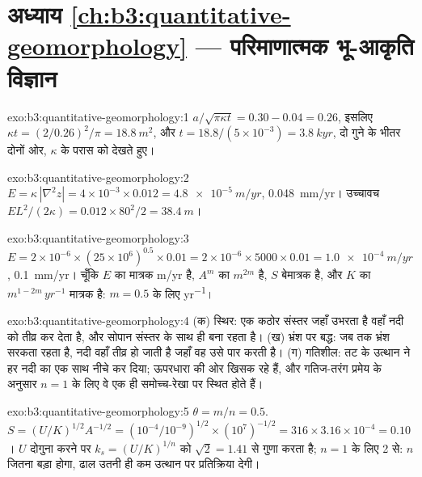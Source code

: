 \section*{अध्याय \ref{ch:b3:quantitative-geomorphology} --- परिमाणात्मक भू-आकृति विज्ञान}

\begin{solution}{exo:b3:quantitative-geomorphology:1}
$a/\sqrt{\pi\kappa t} = 0.30 - 0.04 = 0.26$, इसलिए $\kappa t = (2/0.26)^2/\pi =
\qty{18.8}{m^2}$, और $t = 18.8/(5\times10^{-3}) = \qty{3.8}{kyr}$, दो गुने के भीतर
दोनों ओर, $\kappa$ के परास को देखते हुए।
\end{solution}

\begin{solution}{exo:b3:quantitative-geomorphology:2}
$E = \kappa\,|\nabla^2 z| = 4\times10^{-3}\times0.012 =
\qty{4.8e-5}{m/yr}$, \qty{0.048}{mm/yr}। उच्चावच $E L^2/(2\kappa) =
0.012\times80^2/2 = \qty{38.4}{m}$।
\end{solution}

\begin{solution}{exo:b3:quantitative-geomorphology:3}
$E = 2\times10^{-6}\times(25\times10^6)^{0.5}\times0.01 = 2\times10^{-6}
\times5000\times0.01 = \qty{1.0e-4}{m/yr}$, \qty{0.1}{mm/yr}। चूँकि $E$ का
मात्रक \unit{m/yr} है, $A^m$ का $\unit{m}^{2m}$ है, $S$ बेमात्रक है, और $K$ का
$\unit{m}^{1-2m}\,\unit{yr^{-1}}$ मात्रक है: $m = 0.5$ के लिए \unit{yr^{-1}}।
\end{solution}

\begin{solution}{exo:b3:quantitative-geomorphology:4}
(क) स्थिर: एक कठोर संस्तर जहाँ उभरता है वहाँ नदी को तीव्र कर देता है, और सोपान
संस्तर के साथ ही बना रहता है। (ख) भ्रंश पर बद्ध: जब तक भ्रंश सरकता रहता है,
नदी वहाँ तीव्र हो जाती है जहाँ वह उसे पार करती है। (ग) गतिशील: तट के
उत्थान ने हर नदी का  एक साथ नीचे कर दिया; 
ऊपरधारा की ओर खिसक रहे हैं, और गतिज-तरंग प्रमेय के अनुसार $n
= 1$ के लिए वे एक ही समोच्च-रेखा पर स्थित होते हैं।
\end{solution}

\begin{solution}{exo:b3:quantitative-geomorphology:5}
$\theta = m/n = 0.5$. $S = (U/K)^{1/2}A^{-1/2} = (10^{-4}/10^{-9})^{1/2}
\times(10^7)^{-1/2} = 316\times3.16\times10^{-4} = 0.10$। $U$ दोगुना करने पर
$k_s = (U/K)^{1/n}$ को $\sqrt2 = 1.41$ से गुणा करता है; $n = 1$ के लिए 2 से:
$n$ जितना बड़ा होगा, ढाल उतनी ही कम उत्थान पर प्रतिक्रिया देगी।
\end{solution}

